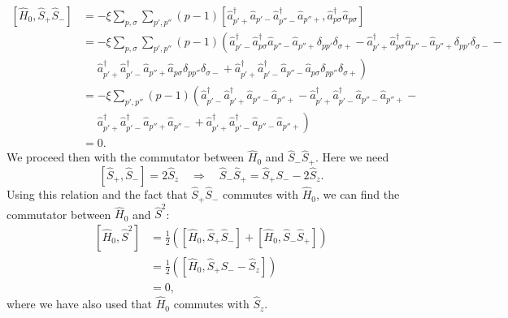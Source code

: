 \documentclass[a4paper,11pt,twoside]{article}
\begin{document}
\begin{align*}
\left[ \hat H_0, \hat S_+ \hat S_- \right]
%
&= - \xi \sum_{p,\sigma} \sum_{p',p''} (p-1)
\left[ \hat a_{p'+}^\dagger \hat a_{p'-} \hat a_{p''-}^\dagger \hat a_{p''+},
\hat a_{p\sigma}^\dagger \hat a_{p\sigma} \right] \\
%
&= - \xi \sum_{p,\sigma} \sum_{p',p''} (p-1) \left(
\hat a_{p'-}^\dagger \hat a_{p\sigma}^\dagger \hat a_{p''-} \hat a_{p''+} \delta_{pp'} \delta_{\sigma+} -
\hat a_{p'+}^\dagger \hat a_{p\sigma}^\dagger \hat a_{p''-} \hat a_{p''+} \delta_{pp'} \delta_{\sigma-} - \right. \\
&\quad\,\, \left.
\hat a_{p'+}^\dagger \hat a_{p'-}^\dagger \hat a_{p''+} \hat a_{p\sigma} \delta_{pp''} \delta_{\sigma-} +
\hat a_{p'+}^\dagger \hat a_{p'-}^\dagger \hat a_{p''-} \hat a_{p\sigma} \delta_{pp''} \delta_{\sigma+} \right) \\
%
&= - \xi \sum_{p',p''} (p-1) \left(
\hat a_{p'-}^\dagger \hat a_{p'+}^\dagger \hat a_{p''-} \hat a_{p''+} -
\hat a_{p'+}^\dagger \hat a_{p'-}^\dagger \hat a_{p''-} \hat a_{p''+} - \right. \\
&\quad\,\, \left.
\hat a_{p'+}^\dagger \hat a_{p'-}^\dagger \hat a_{p''+} \hat a_{p''-} +
\hat a_{p'+}^\dagger \hat a_{p'-}^\dagger \hat a_{p''-} \hat a_{p''+} \right) \\
%
&= 0 .
\end{align*}
%
We proceed then with the commutator between $\hat H_0$ and $\hat S_- \hat S_+$. Here we need
\[ \left[ \hat S_+ , \hat S_- \right] = 2 \hat S_z \quad \Rightarrow \quad
\hat S_- \hat S_+ = \hat S_+ S_- - 2 \hat S_z . \]
%
Using this relation and the fact that 
$\hat S_+ \hat S_-$ commutes with $\hat H_0$, we can find the commutator between $\hat H_0$ and $\hat S^2$:
\begin{align*}
\left[ \hat H_0, \hat S^2 \right]
%
&= \frac{1}{2} \left( \left[ \hat H_0, \hat S_+ \hat S_- \right] + \left[ \hat H_0, \hat S_- \hat S_+ \right] \right) \\
%
&= \frac{1}{2} \left( \left[ \hat H_0, \hat S_+ S_- - \hat S_z \right] \right) \\
%
&= 0,
\end{align*}
where we have also used that $\hat H_0$ commutes with $\hat S_z$.
\end{document}
